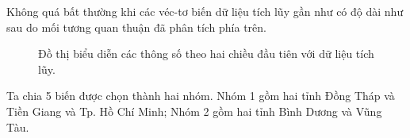 \documentclass[../thesis.tex]{subfiles}
\begin{document}
Không quá bất thường khi các véc-tơ biến dữ liệu tích lũy gần như có độ dài như sau do mối tương quan thuận đã phân tích phía trên.

\newpage
\begin{landscape}
	\begin{Shaded}
		\begin{Highlighting}[]
\SpecialCharTok{\%\textgreater{}\%}\SpecialCharTok{::}
		\NormalTok{,}
		\NormalTok{)}
\SpecialCharTok{\%\textgreater{}\%}\SpecialCharTok{::}
		 \NormalTok{,}
		 \NormalTok{(}\NormalTok{, }\NormalTok{, }\NormalTok{), }
		 \NormalTok{)}
		\end{Highlighting}
	\end{Shaded}

	\begin{figure}[H]
		\centering
		\caption[Đồ thị biểu diễn các thông số theo hai chiều đầu tiên với dữ liệu tích lũy]{Đồ thị biểu diễn các thông số theo hai chiều đầu tiên với dữ liệu tích lũy.}
	\end{figure}
Ta chia 5 biến được chọn thành hai nhóm. Nhóm 1 gồm hai tỉnh Đồng Tháp và Tiền Giang và Tp. Hồ Chí Minh; Nhóm 2 gồm hai tỉnh Bình Dương và Vũng Tàu.
\end{landscape}
\end{document}

